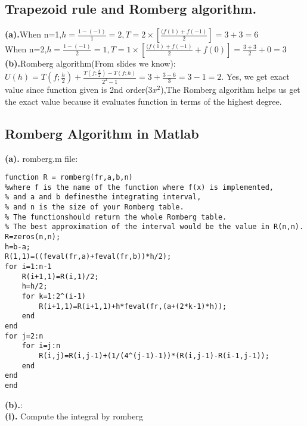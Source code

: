 \subsection{Trapezoid rule and Romberg algorithm.}
\textbf{(a).}When n=1,$h=\frac{1-(-1)}{1}=2,T=2\times [\frac{(f(1)+f(-1)}{2}]=3+3=6$\\
When n=2,$h=\frac{1-(-1)}{2}=1,T=1\times [\frac{(f(1)+f(-1)}{2}+f(0)]=\frac{3+3}{2}+0=3$
\newpage
\textbf{(b).}Romberg algorithm(From slides we know): $U(h)=T(f;\frac{h}{2})+\frac{T(f;\frac{h}{2})-T(f;h)}{2^2-1}=3+\frac{3-6}{3}=3-1=2$. Yes, we get exact value since function given is 2nd order($3x^2$),The Romberg algorithm helps us get the exact value because it evaluates function in terms of the highest degree.
\newpage
\subsection{ Romberg Algorithm in Matlab}
\textbf{(a).} romberg.m file:
\begin{verbatim}
function R = romberg(fr,a,b,n)
%where f is the name of the function where f(x) is implemented, 
% and a and b definesthe integrating interval, 
% and n is the size of your Romberg table. 
% The functionshould return the whole Romberg table. 
% The best approximation of the interval would be the value in R(n,n).
R=zeros(n,n);
h=b-a;
R(1,1)=((feval(fr,a)+feval(fr,b))*h/2);
for i=1:n-1
    R(i+1,1)=R(i,1)/2;
    h=h/2;
    for k=1:2^(i-1)
        R(i+1,1)=R(i+1,1)+h*feval(fr,(a+(2*k-1)*h));
    end
end
for j=2:n
    for i=j:n
        R(i,j)=R(i,j-1)+(1/(4^(j-1)-1))*(R(i,j-1)-R(i-1,j-1));
    end
end
end
\end{verbatim}
\newpage
\textbf{(b).}:\\
\textbf{(i).} Compute the integral by romberg
